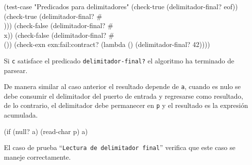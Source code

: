 \documentclass[10pt,oneside,openany,letterpaper]{book}
\begin{document}
\nwenddocs{}\plusendmoddef
(test-case "Predicados para delimitadores"
  (check-true (delimitador-final? eof))
  (check-true (delimitador-final? #\\)))
  (check-false (delimitador-final? #\\x))
  (check-false (delimitador-final? #\\())
  (check-exn exn:fail:contract? (lambda () (delimitador-final? 42))))
\nwendcode{}\nwdocspar

Si {\tt{}c} satisface el predicado {\tt{}\protect{}delimitador-final?} el algoritmo ha terminado de parsear.

\nwenddocs{}
\nwendcode{}\nwdocspar

De manera similar al caso anterior el resultado depende de {\tt{}a}, cuando es nulo se debe consumir el delimitador del puerto de entrada y regresarse como resultado, de lo contrario, el delimitador debe permanecer en {\tt{}p} y el resultado es la expresión acumulada.

\nwenddocs{}\endmoddef
(if (null? a) (read-char p) a)
\nwendcode{}\nwdocspar

El caso de prueba ``{\tt{}Lectura\ de\ delimitador\ final}'' verifica que este caso se maneje correctamente.
\end{document}
